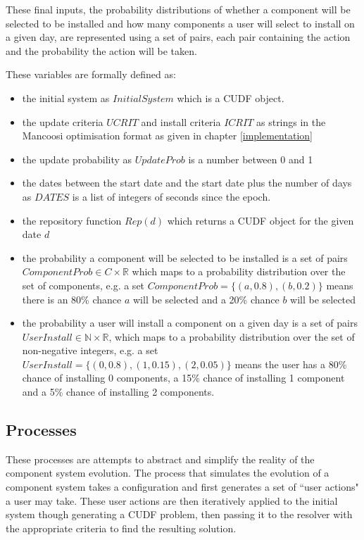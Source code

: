 These final inputs, the probability distributions of whether a component will be selected to be installed and how many components a user will select to install on a given day,
are represented using a set of pairs, each pair containing the action and the probability the action will be taken.

These variables are formally defined as:
\begin{itemize}
  \item the initial system as $InitialSystem$ which is a CUDF object.
  \item the update criteria $UCRIT$ and install criteria $ICRIT$ as strings in the Mancoosi optimisation format as given in chapter \ref{implementation}
  \item the update probability as $UpdateProb$ is a number between 0 and 1
  \item the dates between the start date and the start date plus the number of days as $DATES$ is a list of integers of seconds since the epoch.
  \item the repository function $Rep(d)$ which returns a CUDF object for the given date $d$
  \item the probability a component will be selected to be installed is a set of pairs $ComponentProb \in C \times \mathbb{R}$ which maps to a probability distribution over the set of components,
  e.g. a set $ComponentProb = \{ (a,0.8) , (b,0.2)\}$ means there is an 80\% chance $a$ will be selected and a 20\% chance $b$ will be selected
  \item the probability a user will install a component on a given day is a set of pairs $UserInstall \in \mathbb{N} \times \mathbb{R}$, which maps to a probability distribution over the set of non-negative integers,
  e.g.  a set $UserInstall = \{ (0,0.8) , (1,0.15), (2,0.05)\}$ means the user has a 80\% chance of installing 0 components, a 15\% chance of installing 1 component and a
  5\% chance of installing 2 components.
\end{itemize} 


\subsection{Processes}
These processes are attempts to abstract and simplify the reality of the component system evolution.
The process that simulates the evolution of a component system takes a configuration and first generates a set of ``user actions" a user may take.
These user actions are then iteratively applied to the initial system though generating a CUDF problem,
then passing it to the resolver with the appropriate criteria to find the resulting solution.

